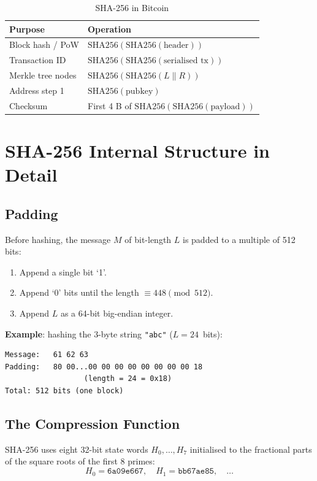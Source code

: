 \documentclass[12pt,a4paper,openany]{book}
\theoremstyle{definition}
\theoremstyle{plain}
\theoremstyle{remark}
\begin{document}
\begin{table}[h]
\centering
\caption{SHA-256 in Bitcoin}
\begin{tabular}{ll}
\toprule
\textbf{Purpose} & \textbf{Operation} \\
\midrule
Block hash / PoW & $\mathrm{SHA256}(\mathrm{SHA256}(\text{header}))$ \\
Transaction ID & $\mathrm{SHA256}(\mathrm{SHA256}(\text{serialised tx}))$ \\
Merkle tree nodes & $\mathrm{SHA256}(\mathrm{SHA256}(L\|R))$ \\
Address step 1 & $\mathrm{SHA256}(\text{pubkey})$ \\
Checksum & First 4 B of $\mathrm{SHA256}(\mathrm{SHA256}(\text{payload}))$ \\
\bottomrule
\end{tabular}
\end{table}

\section{SHA-256 Internal Structure in Detail}

\subsection{Padding}

Before hashing, the message $M$ of bit-length $L$ is padded to a
multiple of 512 bits:
\begin{enumerate}
  \item Append a single bit `1'.
  \item Append `0' bits until the length $\equiv 448 \pmod{512}$.
  \item Append $L$ as a 64-bit big-endian integer.
\end{enumerate}

\textbf{Example}: hashing the 3-byte string \texttt{"abc"} ($L=24$~bits):
\begin{lstlisting}[language={}]
Message:   61 62 63
Padding:   80 00...00 00 00 00 00 00 00 00 18
                  (length = 24 = 0x18)
Total: 512 bits (one block)
\end{lstlisting}

\subsection{The Compression Function}

SHA-256 uses eight 32-bit state words $H_0,\ldots,H_7$ initialised to
the fractional parts of the square roots of the first 8 primes:
\[
H_0 = \texttt{6a09e667},\quad H_1 = \texttt{bb67ae85},\quad\ldots
\]
\end{document}
